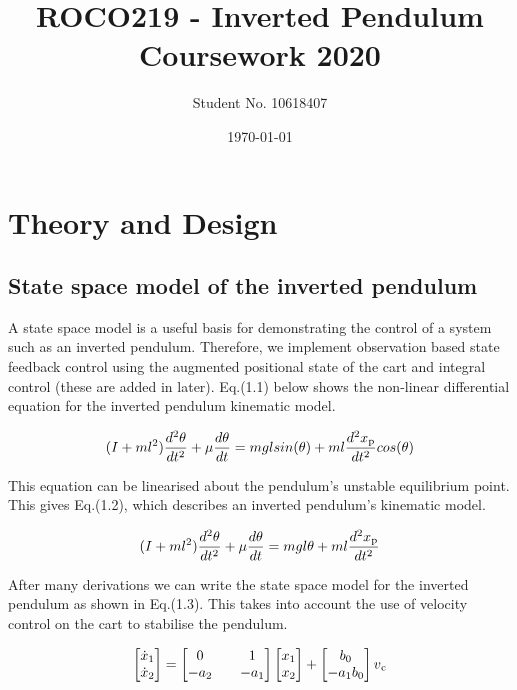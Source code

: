 \documentclass[11pt]{report}
\begin{document}
\title{\bf ROCO219 - Inverted Pendulum Coursework 2020}
\author{Student No. 10618407} 								
\date{\today}
\maketitle
{}
\setcounter{page}{2}
\tableofcontents

\chapter{Theory and Design}

\section{State space model of the inverted pendulum}

A state space model is a useful basis for demonstrating the control of a system such as an inverted pendulum. Therefore, we implement observation based state feedback control using the augmented positional state of the cart and integral control (these are added in later). Eq.(1.1) below shows the non-linear differential equation for the inverted pendulum kinematic model.

\begin{equation}
(I + ml^2)\frac{d^2\theta}{dt^2} + \mu\frac{d\theta}{dt} = mgl sin(\theta) + ml\frac{d^2x\textsubscript{p}}{dt^2}cos(\theta)
\end{equation}

This equation can be linearised about the pendulum's unstable equilibrium point. This gives Eq.(1.2), which describes an inverted pendulum's kinematic model. 

\begin{equation}
(I + ml^2)\frac{d^2\theta}{dt^2} + \mu\frac{d\theta}{dt} = mgl\theta + ml\frac{d^2x\textsubscript{p}}{dt^2}
\end{equation}

After many derivations we can write the state space model for the inverted pendulum as shown in Eq.(1.3). This takes into account the use of velocity control on the cart to stabilise the pendulum.

\begin{equation}
\begin{bmatrix}
\dot{x}\textsubscript{1}\\
\dot{x}\textsubscript{2}\\
\end{bmatrix}
=
\begin{bmatrix}
0 && 1\\
-a\textsubscript{2} && -a\textsubscript{1}\\
\end{bmatrix}
\begin{bmatrix}
x\textsubscript{1}\\
x\textsubscript{2}\\
\end{bmatrix}
+
\begin{bmatrix}
b\textsubscript{0}\\
-a\textsubscript{1}b\textsubscript{0}
\end{bmatrix}
v\textsubscript{c}
\end{equation}
\end{document}
